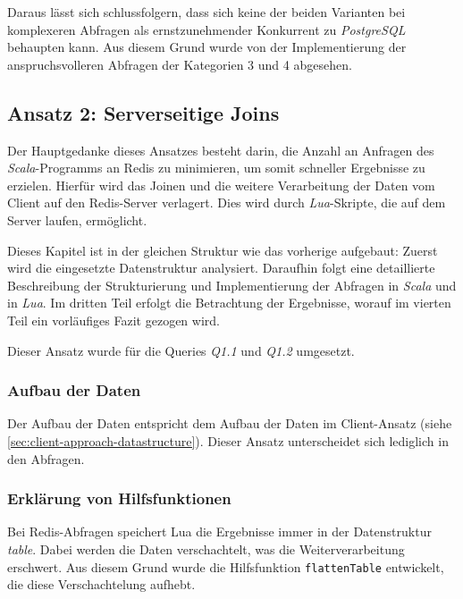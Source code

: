 Daraus lässt sich schlussfolgern, dass sich keine der beiden Varianten bei komplexeren Abfragen als ernstzunehmender Konkurrent zu \emph{PostgreSQL} behaupten kann. Aus diesem Grund wurde von der Implementierung der anspruchsvolleren Abfragen der Kategorien 3 und 4 abgesehen.


\subsection{Ansatz 2: Serverseitige Joins}
Der Hauptgedanke dieses Ansatzes besteht darin, die Anzahl an Anfragen des \emph{Scala}-Programms an Redis zu minimieren, um somit schneller Ergebnisse zu erzielen.
Hierfür wird das Joinen und die weitere Verarbeitung der Daten vom Client auf den Redis-Server verlagert. Dies wird durch \emph{Lua}-Skripte, die auf dem Server laufen, ermöglicht.

Dieses Kapitel ist in der gleichen Struktur wie das vorherige aufgebaut:
Zuerst wird die eingesetzte Datenstruktur analysiert. Daraufhin folgt eine detaillierte Beschreibung der Strukturierung und Implementierung der Abfragen in \emph{Scala} und in \emph{Lua}. Im dritten Teil erfolgt die Betrachtung der Ergebnisse, worauf im vierten Teil ein vorläufiges Fazit gezogen wird.

Dieser Ansatz wurde für die Queries \emph{Q1.1} und \emph{Q1.2} umgesetzt.

\subsubsection{Aufbau der Daten}
Der Aufbau der Daten entspricht dem Aufbau der Daten im Client-Ansatz (siehe \cref{sec:client-approach-datastructure}). Dieser Ansatz unterscheidet sich lediglich in den Abfragen.

\subsubsection{Erklärung von Hilfsfunktionen}
Bei Redis-Abfragen speichert Lua die Ergebnisse immer in der Datenstruktur \emph{table}. Dabei werden die Daten verschachtelt, was die Weiterverarbeitung erschwert. Aus diesem Grund wurde die Hilfsfunktion \lstinline|flattenTable| entwickelt, die diese Verschachtelung aufhebt.

